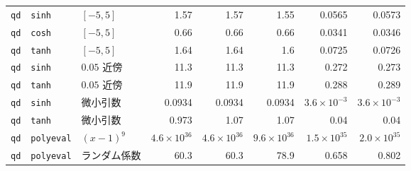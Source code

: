 \documentclass[a4paper,10pt]{ltjsarticle}
\begin{document}
\begin{longtable}{lll rrr rr}
\texttt{qd} & \texttt{sinh} & $[-5,5]$ & 1.57 & 1.57 & 1.55 & 0.0565 & 0.0573 \\
\texttt{qd} & \texttt{cosh} & $[-5,5]$ & 0.66 & 0.66 & 0.66 & 0.0341 & 0.0346 \\
\texttt{qd} & \texttt{tanh} & $[-5,5]$ & 1.64 & 1.64 & 1.6 & 0.0725 & 0.0726 \\
\texttt{qd} & \texttt{sinh} & $0.05$ 近傍 & 11.3 & 11.3 & 11.3 & 0.272 & 0.273 \\
\texttt{qd} & \texttt{tanh} & $0.05$ 近傍 & 11.9 & 11.9 & 11.9 & 0.288 & 0.289 \\
\texttt{qd} & \texttt{sinh} & 微小引数 & 0.0934 & 0.0934 & 0.0934 & $3.6\times10^{-3}$ & $3.6\times10^{-3}$ \\
\texttt{qd} & \texttt{tanh} & 微小引数 & 0.973 & 1.07 & 1.07 & 0.04 & 0.04 \\
\texttt{qd} & \texttt{polyeval} & $(x-1)^9$ & $4.6\times10^{36}$ & $4.6\times10^{36}$ & $9.6\times10^{36}$ & $1.5\times10^{35}$ & $2.0\times10^{35}$ \\
\texttt{qd} & \texttt{polyeval} & ランダム係数 & 60.3 & 60.3 & 78.9 & 0.658 & 0.802 \\
\end{longtable}
\endgroup
\end{document}
